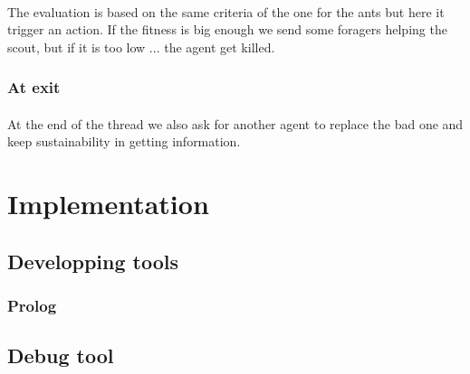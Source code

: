 \documentclass{article}
\begin{document}
			\paragraph{}
			The evaluation is based on the same criteria of the one for the ants but here it trigger an action.
			If the fitness is big enough we send some foragers helping the scout, but if it is too low ... the agent get killed.
		\subsubsection{At exit}
			\paragraph{}
			At the end of the thread we also ask for another agent to replace the bad one and keep sustainability in getting information.

\section{Implementation}
	\subsection{Developping tools}
		\subsubsection{Prolog}
			
	\subsection{Debug tool}
\end{document}
